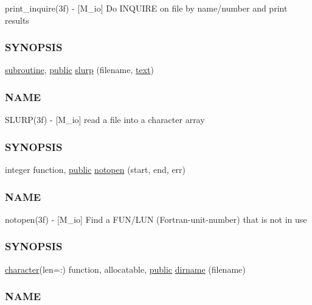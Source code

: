 \begin{DoxyCompactItemize}
\begin{DoxyCompactList}
print\+\_\+inquire(3f) -\/ \mbox{[}M\+\_\+io\mbox{]} Do I\+N\+Q\+U\+I\+RE on file by name/number and print results \subsubsection*{S\+Y\+N\+O\+P\+S\+IS}\end{DoxyCompactList}\item 
\hyperlink{M__stopwatch_83_8txt_acfbcff50169d691ff02d4a123ed70482}{subroutine}, \hyperlink{M__stopwatch_83_8txt_a2f74811300c361e53b430611a7d1769f}{public} \hyperlink{namespacem__io_ad25822cde8058cd6861e2d9a5d729ccc}{slurp} (filename, \hyperlink{notes_8txt_ad997a48ee1fbabed5333859846b5d9a3}{text})
\begin{DoxyCompactList}\small\item\em \subsubsection*{N\+A\+ME}

S\+L\+U\+R\+P(3f) -\/ \mbox{[}M\+\_\+io\mbox{]} read a file into a character array \subsubsection*{S\+Y\+N\+O\+P\+S\+IS}\end{DoxyCompactList}\item 
integer function, \hyperlink{M__stopwatch_83_8txt_a2f74811300c361e53b430611a7d1769f}{public} \hyperlink{namespacem__io_a673f7f7e137424eed9c6a736901a5cbc}{notopen} (start, end, err)
\begin{DoxyCompactList}\small\item\em \subsubsection*{N\+A\+ME}

notopen(3f) -\/ \mbox{[}M\+\_\+io\mbox{]} Find a F\+U\+N/\+L\+UN (Fortran-\/unit-\/number) that is not in use \subsubsection*{S\+Y\+N\+O\+P\+S\+IS}\end{DoxyCompactList}\item 
\hyperlink{option__stopwatch_83_8txt_abd4b21fbbd175834027b5224bfe97e66}{character}(len=\+:) function, allocatable, \hyperlink{M__stopwatch_83_8txt_a2f74811300c361e53b430611a7d1769f}{public} \hyperlink{namespacem__io_a85eb6aa886ca8e591fdc837919f81708}{dirname} (filename)
\begin{DoxyCompactList}\small\item\em \subsubsection*{N\+A\+ME}


\end{DoxyCompactList}
\end{DoxyCompactItemize}
